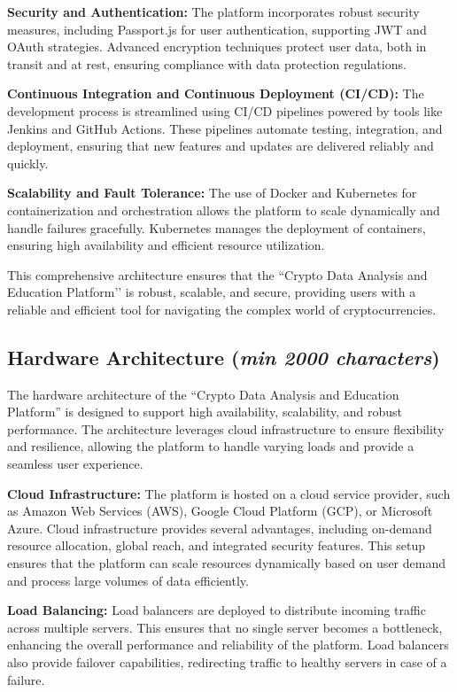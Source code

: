 \documentclass[12pt]{report}
\newcommand{\characters}[1]{(\textit{min #1 characters})}
\begin{document}
\textbf{Security and Authentication:} The platform incorporates robust security measures, including Passport.js for user authentication, supporting JWT and OAuth strategies. Advanced encryption techniques protect user data, both in transit and at rest, ensuring compliance with data protection regulations.

\textbf{Continuous Integration and Continuous Deployment (CI/CD):} The development process is streamlined using CI/CD pipelines powered by tools like Jenkins and GitHub Actions. These pipelines automate testing, integration, and deployment, ensuring that new features and updates are delivered reliably and quickly.

\textbf{Scalability and Fault Tolerance:} The use of Docker and Kubernetes for containerization and orchestration allows the platform to scale dynamically and handle failures gracefully. Kubernetes manages the deployment of containers, ensuring high availability and efficient resource utilization.

This comprehensive architecture ensures that the ``Crypto Data Analysis and Education Platform’’ is robust, scalable, and secure, providing users with a reliable and efficient tool for navigating the complex world of cryptocurrencies.
\subsection{Hardware Architecture \characters{2000}}
The hardware architecture of the “Crypto Data Analysis and Education Platform” is designed to support high availability, scalability, and robust performance. The architecture leverages cloud infrastructure to ensure flexibility and resilience, allowing the platform to handle varying loads and provide a seamless user experience.

\textbf{Cloud Infrastructure:} The platform is hosted on a cloud service provider, such as Amazon Web Services (AWS), Google Cloud Platform (GCP), or Microsoft Azure. Cloud infrastructure provides several advantages, including on-demand resource allocation, global reach, and integrated security features. This setup ensures that the platform can scale resources dynamically based on user demand and process large volumes of data efficiently.

\textbf{Load Balancing:} Load balancers are deployed to distribute incoming traffic across multiple servers. This ensures that no single server becomes a bottleneck, enhancing the overall performance and reliability of the platform. Load balancers also provide failover capabilities, redirecting traffic to healthy servers in case of a failure.
\end{document}
